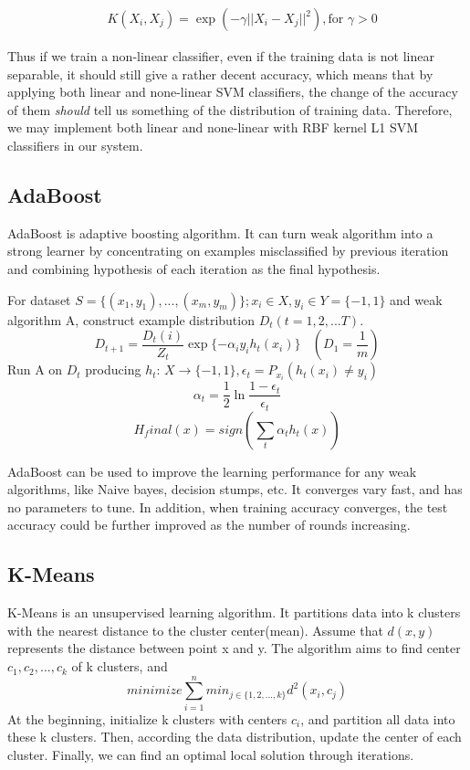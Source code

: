 \documentclass{article} %
\begin{document}
\begin{equation}
\begin{aligned}
&K(X_i, X_j) = \exp (- \gamma ||X_i - X_j||^2), \text{for } \gamma > 0
\end{aligned}
\end{equation}

Thus if we train a non-linear classifier, even if the training data is not linear separable, it should still give a rather decent accuracy, which means that by applying both linear and none-linear SVM classifiers, the change of the accuracy of them \emph{should} tell us something of the distribution of training data. Therefore, we may implement both linear and none-linear with RBF kernel L1 SVM classifiers in our system.  

\subsection{AdaBoost}
AdaBoost is adaptive boosting algorithm. It can turn weak algorithm into a strong learner by concentrating on examples misclassified by previous iteration and combining hypothesis of each iteration as the final hypothesis. 

For dataset $S=\{(x_1, y_1),...,(x_m, y_m)\}; x_i\in X, y_i\in Y=\{-1, 1\}$ and weak algorithm A, construct example distribution $D_t (t=1,2,...T)$. 
$$D_{t+1}=\frac{D_t(i)}{Z_t}\exp\{-\alpha_i y_i h_t(x_i)\} ~~~~(D_1=\frac{1}{m})$$
Run A on $D_t$ producing $h_t$:
$X\rightarrow \{-1, 1\}, \epsilon_t=P_{x_i}(h_t(x_i)\ne y_i)$
$$\alpha_t = \frac{1}{2}\ln{\frac{1-\epsilon_t}{\epsilon_t}}$$
$$H_final(x)=sign(\sum_t {\alpha_t h_t(x)})$$

AdaBoost can be used to improve the learning performance for any weak algorithms, like Naive bayes, decision stumps, etc. It converges vary fast, and has no parameters to tune. In addition, when training accuracy converges, the test accuracy could be further improved as the number of rounds increasing.

\subsection{K-Means}
K-Means is an unsupervised learning algorithm. It partitions data into k clusters with the nearest distance to the cluster center(mean). Assume that $d(x, y)$ represents the distance between point x and y. The algorithm aims to find center $c_1, c_2, ..., c_k$ of k clusters, and
$$minimize \sum_{i=1}^{n}{min_{j\in\{1, 2, ..., k\}} d^2(x_i, c_j)}$$
At the beginning, initialize k clusters with centers $c_i$, and partition all data into these k clusters. Then, according the data distribution, update the center of each cluster. Finally, we can find an optimal local solution through iterations.
\end{document}
